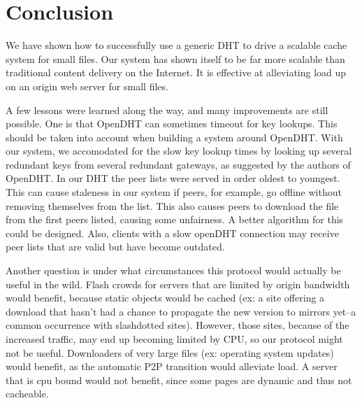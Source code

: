 \section{Conclusion}

We have shown how to successfully use a generic DHT to drive a scalable cache system for small files.
Our system has shown itself to be far more scalable than traditional content delivery on the Internet.
It is effective at alleviating load up on an origin web server for small files.

A few lessons were learned along the way, and many improvements are still possible.  
One is that OpenDHT can sometimes timeout for key lookups. %
This should be taken into account when building a system around OpenDHT.
With our system, we accomodated for the slow key lookup times by looking up several redundant keys from several redundant gateways,
as suggested by the authors of OpenDHT\cite{OpenDHT}.
In our DHT the peer lists were served in order oldest to youngest. This can cause staleness in our system if peers, for example,
go offline without removing themselves from the list. This also causes peers to download the file
from the first peers listed, causing some unfairness\cite{Brian_Thesis}. A better algorithm for
this could be designed. Also, clients with a slow openDHT connection may receive peer lists that
are valid but have become outdated.

Another question is under what circumstances this protocol would actually be useful in the wild. Flash crowds
for servers that are limited by origin bandwidth would benefit, because static objects would
be cached (ex: a site offering a download that hasn't had a chance to propagate the new version to
mirrors yet--a common occurrence with slashdotted sites). However, those sites, because of the
increased traffic, may end up becoming limited by CPU, so our protocol might not be useful. 
Downloaders of very large files (ex: operating
system updates) would benefit, as the automatic P2P transition would alleviate load. 
A server that is cpu bound
would not benefit, since some pages are dynamic and thus not cacheable. 

